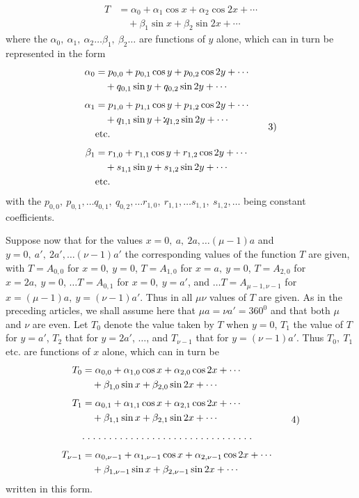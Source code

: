 \begin{landscape}
\[
\begin{aligned}
T&=\alpha_0+\alpha_1\cos x+\alpha_2\cos2x+\cdots\\
 &\quad+\beta_1\sin x+\beta_2\sin2x+\cdots
\end{aligned}\tag*{2)}
\]
where the \(\alpha_0,\ \alpha_1,\ \alpha_2\ldots\beta_1,\ \beta_2\ldots\) are functions of \(y\) alone, which can in turn be represented in the form
\[
\begin{aligned}
\alpha_0&=p_{0,0}+p_{0,1}\cos y+p_{0,2}\cos2y+\cdots\\
 &\quad+q_{0,1}\sin y+q_{0,2}\sin2y+\cdots\\[4pt]
\alpha_1&=p_{1,0}+p_{1,1}\cos y+p_{1,2}\cos2y+\cdots\\
 &\quad+q_{1,1}\sin y+\VFivePair q_{1,2}\sin2y+\cdots\\
 &\text{etc.}\\[4pt]
\beta_1&=r_{1,0}+r_{1,1}\cos y+r_{1,2}\cos2y+\cdots\\
 &\quad+s_{1,1}\sin y+s_{1,2}\sin2y+\cdots\\
 &\text{etc.}
\end{aligned}\tag*{3)}
\]
with the \(p_{0,0},\ p_{0,1},\ldots q_{0,1},\ q_{0,2},\ldots r_{1,0},\ r_{1,1},\ldots s_{1,1},\ s_{1,2},\ldots\) being constant coefficients.

\par\noindent\hspace*{\parindent}Suppose now that for the values \(x=0,\ a,\ 2a,\ldots(\mu-1)a\) and \(y=0,\ a',\ 2a',\ldots(\nu-1)a'\) the corresponding values of the function \(T\) are given, with \(T=A_{0,0}\) for \(x=0,\ y=0\), \(T=A_{1,0}\) for \(x=a,\ y=0\), \(T=A_{2,0}\) for \(x=2a,\ y=0\), \(\ldots T=A_{0,1}\) for \(x=0,\ y=a'\), and \(\ldots T=A_{\mu-1,\nu-1}\) for \(x=(\mu-1)a,\ y=(\nu-1)a'\). Thus in all \(\mu\nu\) values of \(T\) are given. As in the preceding articles, we shall assume here that \(\mu a=\nu a'=360^0\) and that both \(\mu\) and \(\nu\) are even. Let \(T_0\) denote the value taken by \(T\) when \(y=0\), \(T_1\) the value of \(T\) for \(y=a'\), \(T_2\) that for \(y=2a'\), \(\ldots\), and \(T_{\nu-1}\) that for \(y=(\nu-1)a'\). Thus \(T_0,\ T_1\) etc. are functions of \(x\) alone, which can in turn be
\[
\begin{aligned}
T_0&=\alpha_{0,0}+\alpha_{1,0}\cos x+\alpha_{2,0}\cos2x+\cdots\\
 &\quad+\beta_{1,0}\sin x+\beta_{2,0}\sin2x+\cdots\\[4pt]
T_1&=\alpha_{0,1}+\alpha_{1,1}\cos x+\alpha_{2,1}\cos2x+\cdots\\
 &\quad+\beta_{1,1}\sin x+\beta_{2,1}\sin2x+\cdots\\[4pt]
 &\mathord{.}\mkern5mu\mathord{.}\mkern5mu\mathord{.}\mkern5mu\mathord{.}\mkern5mu\mathord{.}\mkern5mu\mathord{.}\mkern5mu\mathord{.}\mkern5mu\mathord{.}\mkern5mu\mathord{.}\mkern5mu\mathord{.}\mkern5mu\mathord{.}\mkern5mu\mathord{.}\mkern5mu\mathord{.}\mkern5mu\mathord{.}\mkern5mu\mathord{.}\mkern5mu\mathord{.}\mkern5mu\mathord{.}\mkern5mu\mathord{.}\mkern5mu\mathord{.}\mkern5mu\mathord{.}\mkern5mu\mathord{.}\mkern5mu\mathord{.}\mkern5mu\mathord{.}\mkern5mu\mathord{.}\mkern5mu\mathord{.}\mkern5mu\mathord{.}\mkern5mu\mathord{.}\mkern5mu\mathord{.}\mkern5mu\mathord{.}\mkern5mu\mathord{.}\mkern5mu\mathord{.}\mkern5mu\mathord{.}\mkern5mu\\[4pt]
T_{\nu-1}&=\alpha_{0,\nu-1}+\alpha_{1,\nu-1}\cos x+\alpha_{2,\nu-1}\cos2x+\cdots\\
 &\quad+\beta_{1,\nu-1}\sin x+\beta_{2,\nu-1}\sin2x+\cdots
\end{aligned}\tag*{4)}
\]
written in this form.


\end{landscape}
